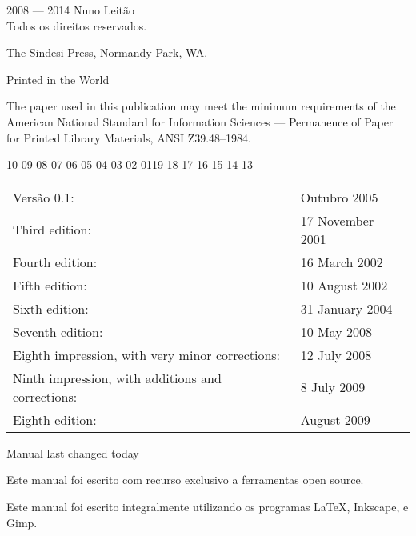 \documentclass[a4paper,11pt,openany]{memoir}
\newcommand{\PWnote}[2]{}
\begin{document}
\PWnote{2009/06/26}{Updated the copyright page for 9th impression}
\begingroup
\footnotesize
\setlength{\parindent}{0pt}
\setlength{\parskip}{\baselineskip}
\textcopyright{} 2008 --- 2014 Nuno Leitão \\
Todos os direitos reservados.

The Sindesi Press, Normandy Park, WA.

Printed in the World 

The paper used in this publication may meet the minimum requirements
of the American National Standard for Information 
Sciences --- Permanence of Paper for Printed Library Materials, 
ANSI Z39.48--1984.

\PWnote{2009/07/08}{Changed manual date to 8 July 2009}
\begin{center}
10 09 08 07 06 05 04 03 02 01\hspace{2em}19 18 17 16 15 14 13
\end{center}
\begin{center}
\begin{tabular}{ll}
Versão 0.1:                        & Outubro 2005 \\
Third edition:                        & 17 November 2001 \\
Fourth edition:                       & 16 March 2002 \\
Fifth edition:                        & 10 August 2002 \\
Sixth edition:                        & 31 January 2004 \\
Seventh edition:                       & 10 May 2008 \\
Eighth impression, with very minor corrections: & 12 July 2008 \\
Ninth impression, with additions and corrections: & 8 July 2009 \\
Eighth edition:                        & August 2009 \\
\end{tabular}
\end{center}
Manual last changed today%

Este manual foi escrito com recurso exclusivo a ferramentas open source.

Este manual foi escrito integralmente utilizando os programas  \LaTeX , Inkscape, e Gimp.
\end{document}
